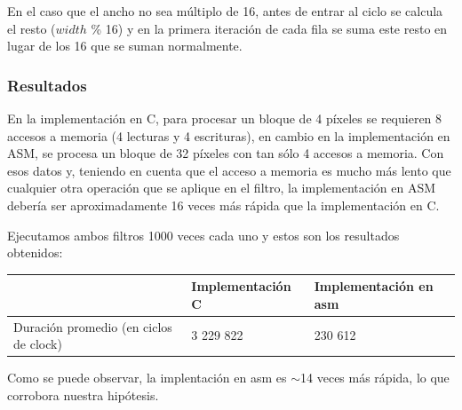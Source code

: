 En el caso que el ancho no sea múltiplo de 16, antes de entrar al ciclo se calcula el resto ($width$ \% 16) y en la primera iteración de cada fila se suma este resto en lugar de los 16 que se suman normalmente.

\subsubsection{Resultados}

En la implementación en C, para procesar un bloque de 4 píxeles se requieren 8 accesos a memoria (4 lecturas y 4 escrituras), en cambio en la implementación en ASM, se procesa un bloque de 32 píxeles con tan sólo 4 accesos a memoria.
Con esos datos y, teniendo en cuenta que el acceso a memoria es mucho más lento que cualquier otra operación que se aplique en el filtro, la implementación en ASM debería ser aproximadamente 16 veces más rápida que la implementación en C.

Ejecutamos ambos filtros 1000 veces cada uno y estos son los resultados obtenidos:

\begin{center}
    \begin{tabular}{|l|l|l|}
        \hline
         & Implementación C & Implementación en asm  \\
        \hline
        Duración promedio (en ciclos de clock) & 3 229 822       & 230 612                 \\
        \hline
    \end{tabular}
\end{center}

Como se puede observar, la implentación en asm es $\sim$14 veces más rápida, lo que corrobora nuestra hipótesis.
